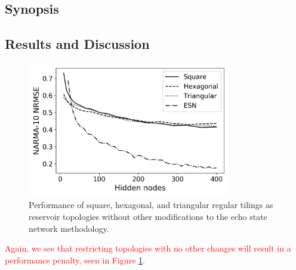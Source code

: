 \subsection{Synopsis}

\subsection{Results and Discussion}

\begin{figure}[h!]
  \centering
  \includegraphics[width=3.5in]{figures/regular-tilings-performance.png}
  \caption{
    Performance of square, hexagonal, and triangular regular tilings as
reservoir topologies without other modifications to the echo state network
methodology.
  }
  \label{fig:rt-performance}
\end{figure}

\textcolor{red}{
  Again, we see that restricting topologies with no other changes will result in
a performance penalty, seen in Figure \ref{fig:rt-performance}.
}

